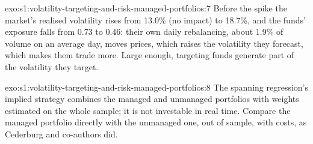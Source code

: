 \begin{solution}{exo:s1:volatility-targeting-and-risk-managed-portfolios:7}
Before the spike the market's realised volatility rises from 13.0\% (no impact) to 18.7\%, and the funds' exposure falls from 0.73 to 0.46: their own
daily rebalancing, about 1.9\% of volume on an average day, moves prices, which raises the volatility they forecast, which makes them trade more. Large
enough, targeting funds generate part of the volatility they target.
\end{solution}

\begin{solution}{exo:s1:volatility-targeting-and-risk-managed-portfolios:8}
The spanning regression's implied strategy combines the managed and unmanaged portfolios with weights estimated on the whole sample; it is not
investable in real time. Compare the managed portfolio directly with the unmanaged one, out of sample, with costs, as Cederburg and co-authors did.
\end{solution}

